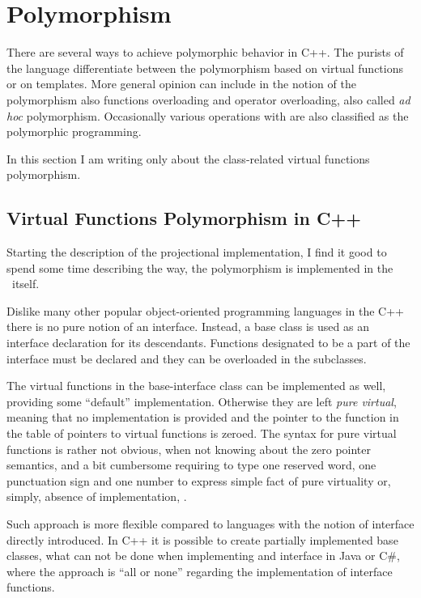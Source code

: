 \section{Polymorphism}

There are several ways to achieve polymorphic behavior in C++. The purists of the language differentiate 
between the polymorphism based on virtual functions or on templates. More general opinion can include
in the notion of the polymorphism also functions overloading and operator overloading, also called 
\emph{ad hoc} polymorphism. Occasionally various operations with  are also classified as 
the polymorphic programming.

In this section I am writing only about the class-related virtual functions polymorphism.

\subsection{Virtual Functions Polymorphism in C++}

Starting the description of the projectional implementation, I find it good to spend some time describing
the way, the polymorphism is implemented in the \cpppl\ itself.

Dislike many other popular object-oriented programming languages in the C++ there is no pure notion of
an interface. Instead, a base class is used as an interface declaration for its descendants. Functions
designated to be a part of the interface must be declared  and they can be overloaded in
the subclasses.

The virtual functions in the base-interface class can be implemented as well, providing some ``default''
implementation. Otherwise they are left \emph{pure virtual}, meaning that no implementation is provided
and the pointer to the function in the table of pointers to virtual functions is zeroed. The syntax
for pure virtual functions is rather not obvious, when not knowing about the zero pointer semantics,
and a bit cumbersome requiring to type one reserved word, one punctuation sign and one number to 
express simple fact of pure virtuality or, simply, absence of implementation, .


Such approach is more flexible compared to languages with the notion of interface directly introduced.
In C++ it is possible to create partially implemented base classes, what can not be done when implementing
and interface in Java or C\#, where the approach is ``all or none'' regarding the implementation of interface
functions.

